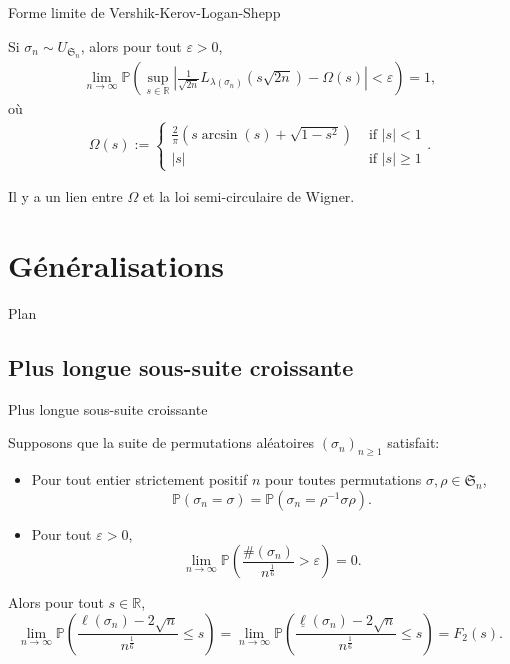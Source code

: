 \documentclass[french]{beamer}
\begin{document}
\begin{frame}{Forme limite de Vershik-Kerov-Logan-Shepp}
    \begin{theorem}
    Si $\sigma_n \sim U_{\mathfrak{S}_n}$, alors pour tout $\varepsilon>0$,
\begin{align*}
\lim_{n\to \infty} \mathbb{P}\left(\sup_{s\in \mathbb{R}} \left|\frac{1}{\sqrt{2n}}L_{\lambda(\sigma_n)}\left({s}{\sqrt{2n}}\right)-\Omega(s)\right|<\varepsilon\right) =1,
\end{align*}
où
\begin{align*}
\Omega(s):=\begin{cases}
\frac{2}{\pi}(s\arcsin({s})+\sqrt{1-s^2}) & \text{ if } |s|<1 \\ 
|s| & \text{ if } |s|\geq 1 
\end{cases}.
\end{align*}
    \end{theorem}
    Il y a un lien entre $\Omega$ et la loi semi-circulaire de Wigner.
\end{frame}

\section{Généralisations}
\begin{frame}{Plan}
\tableofcontents[currentsection,currentsubsection,
    hideothersubsections, 
    sectionstyle=show/shaded,
]
\end{frame}
\subsection{Plus longue sous-suite croissante}
\begin{frame}{Plus longue sous-suite croissante}
    \begin{theorem}[\cite{sk}]
Supposons que la suite de permutations aléatoires  $(\sigma_n)_{n\geq 1}$ satisfait:
\begin{itemize}
\item  Pour tout entier strictement positif $n$ pour toutes permutations  $\sigma,\rho \in \mathfrak{S}_n$,
\begin{equation*}\label{h1}
\mathbb{P}(\sigma_n=\sigma)=\mathbb{P}(\sigma_n=\rho^{-1}\sigma\rho).
\end{equation*}
\item Pour tout $\varepsilon>0$,
\begin{equation*}\label{h2}
\lim_{n\to \infty}\mathbb{P}\left(\frac{\#(\sigma_n)}{n^\frac 16 }>\varepsilon\right) =0.
\end{equation*}
\end{itemize}
Alors pour tout  $s \in \mathbb{R}$,
\begin{equation*} \label{TW} 
\lim_{n\to \infty} \mathbb{P}\left(\frac{\ell(\sigma_n)-2\sqrt{n}}{n^\frac 16}\leq s\right)=\lim_{n\to \infty} \mathbb{P}\left(\frac{\underline{\ell}(\sigma_n)-2\sqrt{n}}{n^\frac 16}\leq s\right)=F_2(s).
\end{equation*}
\end{theorem}
\end{frame}
\end{document}

